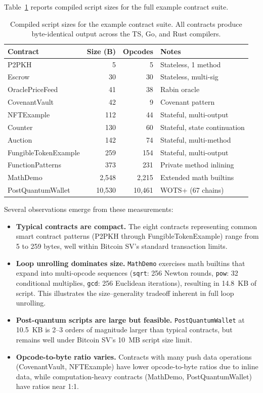 \documentclass[11pt,a4paper]{article}
\begin{document}
Table~\ref{tab:sizes} reports compiled script sizes for the full example
contract suite.

\begin{table}[h]
\centering
\small
\begin{tabular}{@{}lrrl@{}}
\toprule
\textbf{Contract} & \textbf{Size (B)} & \textbf{Opcodes} & \textbf{Notes} \\
\midrule
P2PKH & 5 & 5 & Stateless, 1 method \\
Escrow & 30 & 30 & Stateless, multi-sig \\
OraclePriceFeed & 41 & 38 & Rabin oracle \\
CovenantVault & 42 & 9 & Covenant pattern \\
NFTExample & 112 & 44 & Stateful, multi-output \\
Counter & 130 & 60 & Stateful, state continuation \\
Auction & 142 & 74 & Stateful, multi-method \\
FungibleTokenExample & 259 & 154 & Stateful, multi-output \\
FunctionPatterns & 373 & 231 & Private method inlining \\
MathDemo & 2,548 & 2,215 & Extended math builtins \\
PostQuantumWallet & 10,530 & 10,461 & WOTS+ (67 chains) \\
\bottomrule
\end{tabular}
\caption{Compiled script sizes for the example contract suite.
  All contracts produce byte-identical output across the TS, Go, and
  Rust compilers.}
\label{tab:sizes}
\end{table}

Several observations emerge from these measurements:

\begin{itemize}[nosep]
  \item \textbf{Typical contracts are compact.} The eight contracts
    representing common smart contract patterns (P2PKH through
    FungibleTokenExample) range from 5 to 259 bytes, well within
    Bitcoin SV's standard transaction limits.
  \item \textbf{Loop unrolling dominates size.} \texttt{MathDemo}
    exercises math builtins that expand into multi-opcode sequences
    (\texttt{sqrt}: 256 Newton rounds, \texttt{pow}: 32 conditional
    multiplies, \texttt{gcd}: 256 Euclidean iterations), resulting in
    14.8~KB of script. This illustrates the size--generality tradeoff
    inherent in full loop unrolling.
  \item \textbf{Post-quantum scripts are large but feasible.}
    \texttt{PostQuantumWallet} at 10.5~KB is 2--3 orders of magnitude
    larger than typical contracts, but remains well under Bitcoin SV's
    10~MB script size limit.
  \item \textbf{Opcode-to-byte ratio varies.} Contracts with many push
    data operations (CovenantVault, NFTExample) have lower opcode-to-byte
    ratios due to inline data, while computation-heavy contracts
    (MathDemo, PostQuantumWallet) have ratios near 1:1.
\end{itemize}
\end{document}
